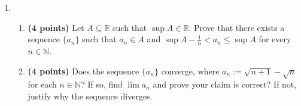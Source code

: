 \documentclass[10pt]{article}
\newcommand{\N}{\mathbb{N}}
\newcommand{\R}{\mathbb{R}}
\begin{document}
\begin{enumerate}
\item \begin{enumerate}
\item \textbf{(4 points)} Let $A\subseteq \R$ such that $\sup A\in \R$. Prove that there exists a sequence $\{a_n\}$ such that $a_n\in A$ and $\sup A-\frac{1}{n}< a_n\leq \sup A$ for every $n\in \N$. 

\item \textbf{(4 points)} Does the sequence $\{a_n\}$ converge, where $a_n:=\sqrt{n+1}-\sqrt{n}$ for each $n\in \N$? If so, find $\lim a_n$ and prove your claim is correct? If not, justify why the sequence diverges. 
\end{enumerate}
\end{enumerate}
\end{document}
